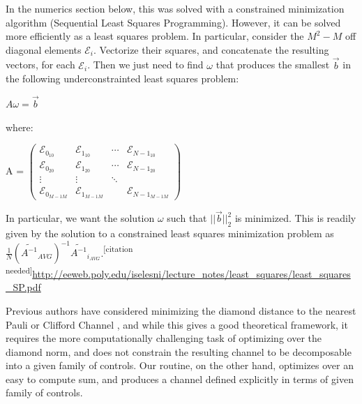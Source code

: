 \documentclass[aps,nofootinbib,pra,notitlepage,twocolumn]{revtex4-1}
\newcommand{\needcite}{{\color{blue}\textsuperscript{[citation needed]}}}
\begin{document}
In the numerics section below, this was solved with a constrained minimization algorithm (Sequential Least Squares Programming\cite{wright1999numerical}). However, it can be solved more efficiently as a least squares problem. In particular, consider the $M^2-M$ off diagonal elements $\mathcal{E}_i$. Vectorize their squares, and concatenate the resulting vectors, for each $\mathcal{E}_i$. Then we just need to find $\omega$ that produces the smallest $\vec{b}$ in the following underconstrainted least squares problem:
\begin{center}
$A\omega= \vec{b}$
\end{center}
where:
\begin{center}

A = $\begin{pmatrix}
\mathcal{E}_{0_{10}} & \mathcal{E}_{1_{10}} & \cdots & \mathcal{E}_{N-1_{10}}\\
\mathcal{E}_{0_{20}} & \mathcal{E}_{1_{20}} & \cdots &\mathcal{E}_{N-1_{20}}\\
\vdots & \vdots & \ddots & \\
\mathcal{E}_{0_{M-1 M}} &\mathcal{E}_{1_{M-1 M}} & & \mathcal{E}_{N-1_{M-1 M}}
\end{pmatrix}
$
\end{center}
In particular, we want the solution $\omega$ such that $||\vec{b}||_2^2$ is minimized. This is readily given by the solution to a constrained least squares minimization problem as $\frac{1}{N}(\tilde{A^{-1}}_{AVG})^{-1}\tilde{A^{-1}}_{i_{AVG}}$.\needcite\url{http://eeweb.poly.edu/iselesni/lecture_notes/least_squares/least_squares_SP.pdf}

Previous authors have considered minimizing the diamond distance to the nearest Pauli or Clifford Channel \cite{Magesan2013}, and while this gives a good theoretical framework, it requires the more computationally challenging task of optimizing over the diamond norm, and does not constrain the resulting channel to be decomposable into a given family of controls. Our routine, on the other hand, optimizes over an easy to compute sum, and produces a channel defined explicitly in terms of given family of controls.

\end{document}
